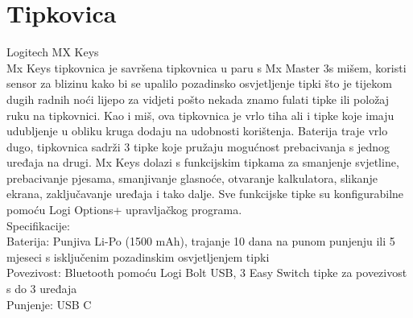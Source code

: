 \documentclass{report}
\begin{document}
\chapter{Tipkovica}
Logitech MX Keys
\\Mx Keys tipkovnica je savršena tipkovnica u paru s Mx Master 3s mišem, koristi sensor za blizinu kako bi se upalilo pozadinsko osvjetljenje tipki što je tijekom dugih radnih noći lijepo za vidjeti pošto nekada znamo fulati tipke ili položaj ruku na tipkovnici. Kao i miš, ova tipkovnica je vrlo tiha ali i tipke koje imaju udubljenje u obliku kruga dodaju na udobnosti korištenja. Baterija traje vrlo dugo, tipkovnica sadrži 3 tipke koje pružaju mogućnost prebacivanja s jednog uređaja na drugi. Mx Keys dolazi s funkcijskim tipkama za smanjenje svjetline, prebacivanje pjesama, smanjivanje glasnoće, otvaranje kalkulatora, slikanje ekrana, zaključavanje uređaja i tako dalje. Sve funkcijske tipke su konfigurabilne pomoću Logi Options+ upravljačkog programa.
\\Specifikacije:
\\Baterija: Punjiva Li-Po (1500 mAh), trajanje 10 dana na punom punjenju ili 5 mjeseci s isključenim pozadinskim osvjetljenjem tipki
\\Povezivost: Bluetooth pomoću Logi Bolt USB, 3 Easy Switch tipke za povezivost s do 3 uređaja
\\Punjenje: USB C
\end{document}
